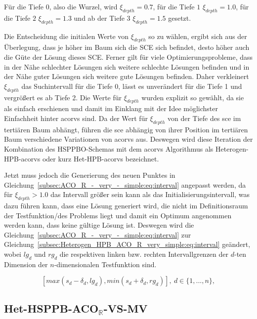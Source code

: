 \documentclass[fontsize=12, a4aper]{scrartcl}
\begin{document}
	\noindent Für die Tiefe \(0\), also die Wurzel, wird \(\xi_{depth} = 0.7\), für die Tiefe \(1\) \(\xi_{depth} = 1.0\), für die Tiefe \(2\) \(\xi_{depth} = 1.3\) und ab der Tiefe \(3\) \(\xi_{depth} = 1.5\) gesetzt.\hfill\newline
	
	\noindent Die Entscheidung die initialen Werte von \(\xi_{depth}\) so zu wählen, ergibt sich aus der Überlegung, dass je höher im Baum sich die SCE sich befindet, desto höher auch die Güte der Lösung dieses SCE. Ferner gilt für viele Optimierungsprobleme, dass in der Nähe schlechter Lösungen sich weitere schlechte Lösungen befinden und in der Nähe guter Lösungen sich weitere gute Lösungen befinden. Daher verkleinert \(\xi_{depth}\) das Suchintervall für die Tiefe 0, lässt es unverändert für die Tiefe 1 und vergrößert es ab Tiefe 2. Die Werte für \(\xi_{depth}\) wurden explizit so gewählt, da sie als einfach erschienen und damit im Einklang mit der Idee möglichster Einfachheit hinter \ac{acorvs} sind. Da der Wert für \(\xi_{depth}\) von der Tiefe des \ac{sce} im tertiären Baum abhängt, führen die \ac{sce} abhängig von ihrer Position im tertiären Baum verschiedene Variationen von \ac{acorvs} aus. Deswegen wird diese Iteration der Kombination des HSPPBO-Schemas mit dem \ac{acorvs} Algorithmus als Heterogen-HPB-\ac{acorvs} oder kurz Het-HPB-\ac{acorvs} bezeichnet.\hfill\newline
	
	\noindent Jetzt muss jedoch die Generierung des neuen Punktes in Gleichung~\ref{subsec:ACO_R_-_very_-_simple:eq:interval} angepasst werden, da für \(\xi_{depth} > 1.0\) das Intervall größer sein kann als das Initialisierungsintervall, was dazu führen kann, dass eine Lösung generiert wird, die nicht im Definitionsraum der Testfunktion/des Problems liegt und damit ein Optimum angenommen werden kann, dass keine gültige Lösung ist. Deswegen wird die Gleichung~\ref{subsec:ACO_R_-_very_-_simple:eq:interval} zur Gleichung~\ref{subsec:Heterogen_HPB_ACO_R_very_simple:eq:interval} geändert, wobei \(lg_d\) und \(rg_d\) die respektiven linken bzw. rechten Intervallgrenzen der \(d\)-ten Dimension der \(n\)-dimensionalen Testfunktion sind.
	
	\begin{equation} \label{subsec:Heterogen_HPB_ACO_R_very_simple:eq:interval}
		[max(s_d - \delta_d, lg_d), min(s_d + \delta_d, rg_d)], ~ d \in \{1, ..., n\},
	\end{equation}
	
	\subsection{Het-HSPPB-ACO\(_\mathbb{R}\)-VS-MV} \label{subsec:Heterogen_HSPPB_ACO_R_very_simple}
	
\end{document}

